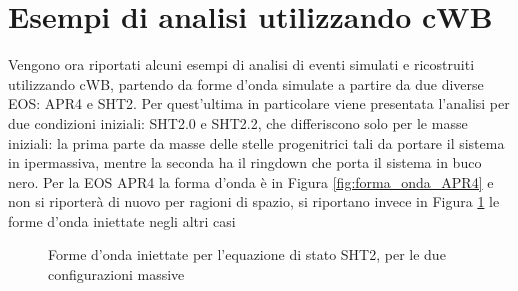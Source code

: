 \section{Esempi di analisi utilizzando cWB}
\label{section:examples}
Vengono ora riportati alcuni esempi di analisi di eventi simulati e ricostruiti utilizzando cWB, partendo da forme d'onda simulate a partire da due diverse EOS: APR4 e SHT2. Per quest'ultima in particolare viene presentata l'analisi per due condizioni iniziali: SHT2.0 e SHT2.2, che differiscono solo per le masse iniziali: la prima parte da masse delle stelle progenitrici tali da portare il sistema in ipermassiva, mentre la seconda ha il ringdown che porta il sistema in buco nero. Per la EOS APR4 la forma d'onda è in Figura \ref{fig:forma_onda_APR4} e non si riporterà di nuovo per ragioni di spazio, si riportano invece in Figura \ref{fig:forme_onda} le forme d'onda iniettate negli altri casi
\begin{figure}[ht]
	\vspace{-10pt}
	\centering
	\quad
	\vspace{-5pt}
	\caption{Forme d'onda iniettate per l'equazione di stato SHT2, per le due configurazioni massive}
	\label{fig:forme_onda}
	\vspace{-15pt}
\end{figure}
